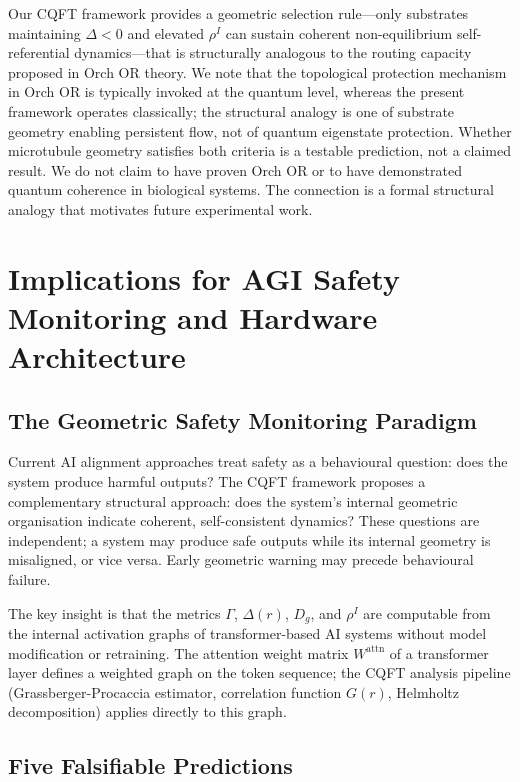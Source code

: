 \documentclass[11pt,a4paper]{article}
\begin{document}
Our CQFT framework provides a geometric selection rule---only substrates maintaining $\Delta < 0$ and elevated $\rho^I$ can sustain coherent non-equilibrium self-referential dynamics---that is structurally analogous to the routing capacity proposed in Orch OR theory. We note that the topological protection mechanism in Orch OR is typically invoked at the quantum level, whereas the present framework operates classically; the structural analogy is one of substrate geometry enabling persistent flow, not of quantum eigenstate protection. Whether microtubule geometry satisfies both criteria is a testable prediction, not a claimed result. We do not claim to have proven Orch OR or to have demonstrated quantum coherence in biological systems. The connection is a formal structural analogy that motivates future experimental work.

\section{Implications for AGI Safety Monitoring and Hardware Architecture}

\subsection{The Geometric Safety Monitoring Paradigm}

Current AI alignment approaches treat safety as a behavioural question: does the system produce harmful outputs? The CQFT framework proposes a complementary structural approach: does the system's internal geometric organisation indicate coherent, self-consistent dynamics? These questions are independent; a system may produce safe outputs while its internal geometry is misaligned, or vice versa. Early geometric warning may precede behavioural failure.

The key insight is that the metrics $\Gamma$, $\Delta(r)$, $D_g$, and $\rho^I$ are computable from the internal activation graphs of transformer-based AI systems without model modification or retraining. The attention weight matrix $W^{\text{attn}}$ of a transformer layer defines a weighted graph on the token sequence; the CQFT analysis pipeline (Grassberger-Procaccia estimator, correlation function $G(r)$, Helmholtz decomposition) applies directly to this graph.

\subsection{Five Falsifiable Predictions}
\end{document}

